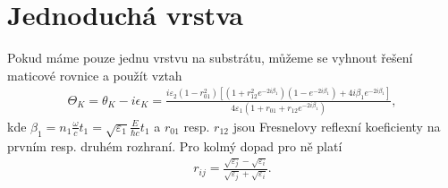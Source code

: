 \section{Jednoduchá vrstva}
Pokud máme pouze jednu vrstvu na substrátu, můžeme se vyhnout řešení maticové rovnice a použít vztah \cite{Mistrik}
\begin{eqnarray}
\Theta_K=\theta_K-i\epsilon_K=\frac{i\varepsilon_2(1-r^2_{01})\left[(1+r^2_{12}e^{-2i\beta_1})(1-e^{-2i\beta_1})+4i\beta_1e^{-2i\beta_1}\right]}{4\varepsilon_1(1+r_{01}+r_{12}e^{-2i\beta_1})},
\label{teor kerr}
\end{eqnarray}
kde $\beta_1=n_1\frac{\omega}{c}t_1=\sqrt{\varepsilon_1}\frac{E}{\hbar c}t_1$ a $r_{01}$ resp. $r_{12}$ jsou Fresnelovy reflexní koeficienty na prvním resp. druhém rozhraní. Pro kolmý dopad pro ně platí
\begin{eqnarray}
r_{ij}=\frac{\sqrt{\varepsilon_j}-\sqrt{\varepsilon_i}}{\sqrt{\varepsilon_j}+\sqrt{\varepsilon_i}}.
\end{eqnarray}
